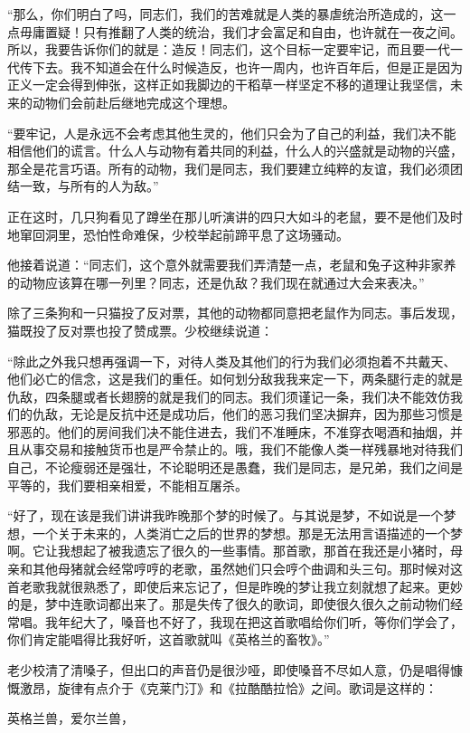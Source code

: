 “那么，你们明白了吗，同志们，我们的苦难就是人类的暴虐统治所造成的，这一点毋庸置疑！只有推翻了人类的统治，我们才会富足和自由，也许就在一夜之间。所以，我要告诉你们的就是：造反！同志们，这个目标一定要牢记，而且要一代一代传下去。我不知道会在什么时候造反，也许一周内，也许百年后，但是正是因为正义一定会得到伸张，这样正如我脚边的干稻草一样坚定不移的道理让我坚信，未来的动物们会前赴后继地完成这个理想。

“要牢记，人是永远不会考虑其他生灵的，他们只会为了自己的利益，我们决不能相信他们的谎言。什么人与动物有着共同的利益，什么人的兴盛就是动物的兴盛，那全是花言巧语。所有的动物，我们是同志，我们要建立纯粹的友谊，我们必须团结一致，与所有的人为敌。”

正在这时，几只狗看见了蹲坐在那儿听演讲的四只大如斗的老鼠，要不是他们及时地窜回洞里，恐怕性命难保，少校举起前蹄平息了这场骚动。

他接着说道：“同志们，这个意外就需要我们弄清楚一点，老鼠和兔子这种非家养的动物应该算在哪一列里？同志，还是仇敌？我们现在就通过大会来表决。”

除了三条狗和一只猫投了反对票，其他的动物都同意把老鼠作为同志。事后发现，猫既投了反对票也投了赞成票。少校继续说道：

“除此之外我只想再强调一下，对待人类及其他们的行为我们必须抱着不共戴天、他们必亡的信念，这是我们的重任。如何划分敌我我来定一下，两条腿行走的就是仇敌，四条腿或者长翅膀的就是我们的同志。我们须谨记一条，我们决不能效仿我们的仇敌，无论是反抗中还是成功后，他们的恶习我们坚决摒弃，因为那些习惯是邪恶的。他们的房间我们决不能住进去，我们不准睡床，不准穿衣喝酒和抽烟，并且从事交易和接触货币也是严令禁止的。哦，我们不能像人类一样残暴地对待我们自己，不论瘦弱还是强壮，不论聪明还是愚蠢，我们是同志，是兄弟，我们之间是平等的，我们要相亲相爱，不能相互屠杀。

“好了，现在该是我们讲讲我昨晚那个梦的时候了。与其说是梦，不如说是一个梦想，一个关于未来的，人类消亡之后的世界的梦想。那是无法用言语描述的一个梦啊。它让我想起了被我遗忘了很久的一些事情。那首歌，那首在我还是小猪时，母亲和其他母猪就会经常哼哼的老歌，虽然她们只会哼个曲调和头三句。那时候对这首老歌我就很熟悉了，即使后来忘记了，但是昨晚的梦让我立刻就想了起来。更妙的是，梦中连歌词都出来了。那是失传了很久的歌词，即使很久很久之前动物们经常唱。我年纪大了，嗓音也不好了，我现在把这首歌唱给你们听，等你们学会了，你们肯定能唱得比我好听，这首歌就叫《英格兰的畜牧》。”

老少校清了清嗓子，但出口的声音仍是很沙哑，即使嗓音不尽如人意，仍是唱得慷慨激昂，旋律有点介于《克莱门汀》和《拉酷酷拉恰》之间。歌词是这样的：

英格兰兽，爱尔兰兽，

